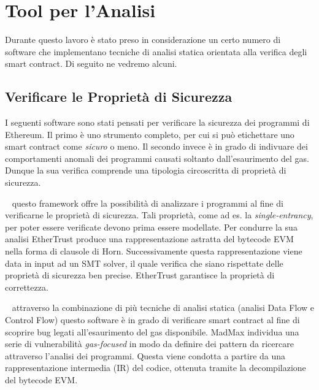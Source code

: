 \section{Tool per l'Analisi}
Durante questo lavoro è stato preso in considerazione un certo numero di software che implementano tecniche di analisi statica orientata alla verifica degli smart contract. Di seguito ne vedremo alcuni.

\subsection{Verificare le Proprietà di Sicurezza}

I seguenti software sono stati pensati per verificare la sicurezza dei programmi di Ethereum.\newline
\indent Il primo è uno strumento completo, per cui si può etichettare uno smart contract come \emph{sicuro} o meno. Il secondo invece è in grado di indivuare dei comportamenti anomali dei programmi causati soltanto dall'esaurimento del gas. Dunque la sua verifica comprende una tipologia circoscritta di proprietà di sicurezza.\newline

\begin{description}[labelindent=1cm]    %

    \item[EtherTrust] ~\cite{grishchenko2018foundations} questo framework offre la possibilità di analizzare i programmi al fine di verificarne le proprietà di sicurezza. Tali proprietà, come ad es. la \textit{single-entrancy}, per poter essere verificate devono prima essere modellate.\newline
    \indent Per condurre la sua analisi EtherTrust produce una rappresentazione astratta del bytecode EVM nella forma di clausole di Horn. Successivamente questa rappresentazione viene data in input ad un SMT solver, il quale verifica che siano rispettate delle proprietà di sicurezza ben precise. EtherTrust garantisce la proprietà di correttezza.\newline

    \item[MadMax] ~\cite{grech2018madmax} attraverso la combinazione di più tecniche di analisi statica (analisi Data Flow e Control Flow) questo software è in grado di verificare smart contract al fine di scoprire bug legati all'esaurimento del gas disponibile.\newline
    \indent MadMax individua una serie di vulnerabilità \textit{gas-focused} in modo da definire dei pattern da ricercare attraverso l'analisi dei programmi. Questa viene condotta a partire da una rappresentazione intermedia (IR) del codice, ottenuta tramite la decompilazione del bytecode EVM.\newline

\end{description}

